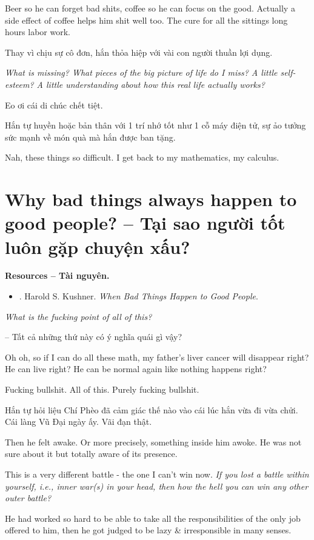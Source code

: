 \documentclass[12pt,oneside]{book}
\begin{document}
Beer so he can forget bad shits, coffee so he can focus on the good. Actually a side effect of coffee helps him shit well too. The cure for all the sittings long hours labor work.

Thay vì chịu sự cô đơn, hắn thỏa hiệp với vài con người thuần lợi dụng. 

{\it What is missing? What pieces of the big picture of life do I miss? A little self-esteem? A little understanding about how this real life actually works?}

Eo ơi cái di chúc chết tiệt.

Hắn tự huyền hoặc bản thân với 1 trí nhớ tốt như 1 cỗ máy điện tử, sự ảo tưởng sức mạnh về món quà mà hắn được ban tặng.

Nah, these things so difficult. I get back to my mathematics, my calculus.

\section{Why bad things always happen to good people? -- Tại sao người tốt luôn gặp chuyện xấu?}
{\bf \textsf{Resources -- Tài nguyên.}}
\begin{itemize}
	\item \cite{Kushner_bad_things_good_people}. {\sc Harold S. Kushner}. {\it When Bad Things Happen to Good People}.
\end{itemize}

{\it What is the fucking point of all of this?}

-- Tất cả những thứ này có ý nghĩa quái gì vậy?

Oh oh, so if I can do all these math, my father's liver cancer will disappear right? He can live right? He can be normal again like nothing happens right?

Fucking bullshit. All of this. Purely fucking bullshit.

Hắn tự hỏi liệu Chí Phèo đã cảm giác thế nào vào cái lúc hắn vừa đi vừa chửi. Cái làng Vũ Đại ngày ấy. Vãi đạn thật.


Then he felt awake. Or more precisely, something inside him awoke. He was not sure about it but totally aware of its presence.

This is a very different battle - the one I can't win now. {\it If you lost a battle within yourself, i.e., inner war(s) in your head, then how the hell you can win any other outer battle?}

He had worked so hard to be able to take all the responsibilities of the only job offered to him, then he got judged to be lazy \& irresponsible in many senses.
\end{document}
